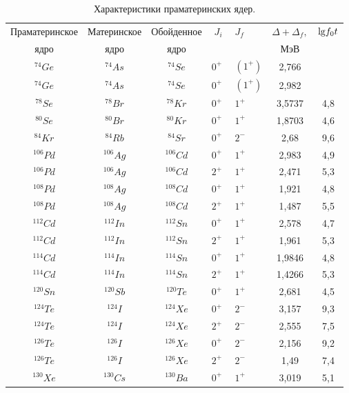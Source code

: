 \documentclass[14pt, a4paper]{article}
\begin{document}
\begin{table}
	\centering
	\caption{Характеристики праматеринских ядер.}
	\tabcolsep=5pt
	\begin{tabular}{|c|c|c|HHc|c|}
		\hline
		Праматеринское& Материнское & Обойденное &$\; J_i\; $&$J_f$&$\Delta + \Delta_f,$&${\rm lg} f_0t$\\
		ядро  &   ядро & ядро &&&$\text{МэВ}$&\\
		\hline
		$^{74}Ge$ & $^{74}As$ &$^{74}Se$ & $0^+$  &  $(1^+)$ & 2,766 &      \\
		$^{74}Ge$ & $^{74}As$ &$^{74}Se$& $0^+$  &  $(1^+)$ & 2,982 &      \\
		$^{78}Se$ & $^{78}Br$ &$^{78}Kr$& $0^+$  &  $1^+$  & 3,5737 &   4,8   \\
		$^{80}Se$ & $^{80}Br$ &$^{80}Kr$& $0^+$  &  $1^+$  & 1,8703 &   4,6  \\
		$^{84}Kr$ & $^{84}Rb$ &$^{84}Sr$& $0^+$  &  $2^-$  & 2,68   &   9,6  \\
		$^{106}Pd$ & $^{106}Ag$ &$^{106}Cd$& $0^+$  &  $1^+$  & 2,983 &   4,9   \\
		$^{106}Pd$ & $^{106}Ag$ &$^{106}Cd$& $2^+$  &  $1^+$  & 2,471 &   5,3   \\
		$^{108}Pd$ & $^{108}Ag$ &$^{108}Cd$& $0^+$  &  $1^+$  & 1,921 &   4,8   \\
		$^{108}Pd$ & $^{108}Ag$ &$^{108}Cd$& $2^+$  &  $1^+$  & 1,487 &   5,5   \\
		$^{112}Cd$ & $^{112}In$ &$^{112}Sn$& $0^+$  &  $1^+$  & 2,578 &   4,7   \\
		$^{112}Cd$ & $^{112}In$ &$^{112}Sn$& $2^+$  &  $1^+$  & 1,961 &   5,3   \\
		$^{114}Cd$ & $^{114}In$ &$^{114}Sn$& $0^+$  &  $1^+$  & 1,9846 &   4,8   \\
		$^{114}Cd$ & $^{114}In$&$^{114}Sn$ & $2^+$  &  $1^+$  & 1,4266 &   5,3   \\
		$^{120}Sn$ & $^{120}Sb$ &$^{120}Te$& $0^+$  &  $1^+$  & 2,681 &   4,5   \\
		$^{124}Te$ & $^{124}I$  &$^{124}Xe$& $0^+$  &  $2^-$  & 3,157 &   9,3   \\
		$^{124}Te$ & $^{124}I$  &$^{124}Xe$& $2^+$  &  $2^-$  & 2,555 &   7,5   \\
		$^{126}Te$ & $^{126}I$  &$^{126}Xe$& $0^+$  &  $2^-$  & 2,156 &   9,2   \\
		$^{126}Te$ & $^{126}I$ &$^{126}Xe$ & $2^+$  &  $2^-$  & 1,49 &   7,4   \\
		$^{130}Xe$ & $^{130}Cs$ &$^{130}Ba$& $0^+$  &  $1^+$  & 3,019 &   5,1   \\

\end{tabular}
\end{table}
\end{document}
